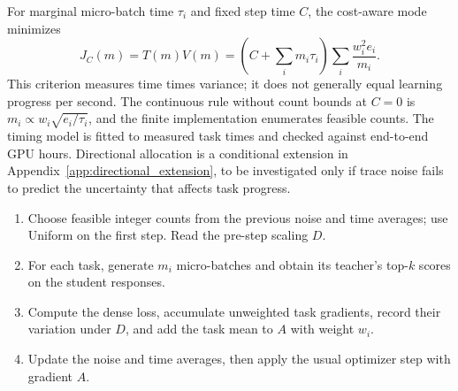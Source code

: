For marginal micro-batch time $\tau_i$ and fixed step time $C$, the
cost-aware mode minimizes
\begin{equation}
    J_C(m)=T(m)V(m)
      =\left(C+\sum_i m_i\tau_i\right)
         \sum_i\frac{w_i^2e_i}{m_i}.
    \label{eq:batch_cost_objective}
\end{equation}
This criterion measures time times variance; it does not generally equal
learning progress per second. The continuous rule without count bounds at
$C=0$ is $m_i\propto w_i\sqrt{e_i/\tau_i}$, and the finite implementation
enumerates feasible counts. The timing model is fitted to measured task
times and checked against end-to-end GPU hours. Directional allocation
is a conditional extension in Appendix~\ref{app:directional_extension},
to be investigated only if trace noise fails to predict the uncertainty
that affects task progress.

\begin{algorithm}[t]
\caption{One training step with GPAS.}
\label{alg:batch_gpas}
\small
\begin{minipage}{0.97\linewidth}
\begin{enumerate}
    \item Choose feasible integer counts from the previous noise and time
    averages; use Uniform on the first step. Read the pre-step scaling $D$.
    \item For each task, generate $m_i$ micro-batches and obtain its
    teacher's top-$k$ scores on the student responses.
    \item Compute the dense loss, accumulate unweighted task gradients,
    record their variation under $D$, and add the task mean to $A$ with
    weight $w_i$.
    \item Update the noise and time averages, then apply the usual
    optimizer step with gradient $A$.
\end{enumerate}
\end{minipage}
\end{algorithm}
